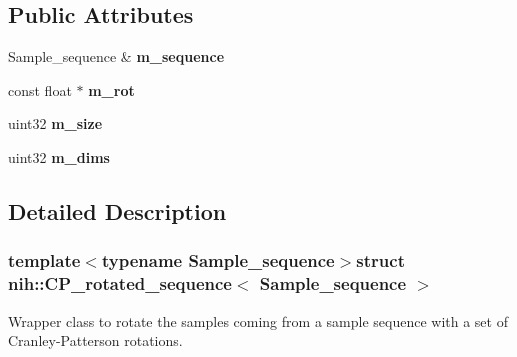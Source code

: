 \subsection*{\-Public \-Attributes}
\begin{DoxyCompactItemize}
\item 
\hypertarget{structnih_1_1_c_p__rotated__sequence_af62a09744624faa6966dd88bcce62844}{
\-Sample\-\_\-sequence \& {\bfseries m\-\_\-sequence}}
\label{structnih_1_1_c_p__rotated__sequence_af62a09744624faa6966dd88bcce62844}

\item 
\hypertarget{structnih_1_1_c_p__rotated__sequence_a170f1d2705c53b1979c5c788d0945f25}{
const float $\ast$ {\bfseries m\-\_\-rot}}
\label{structnih_1_1_c_p__rotated__sequence_a170f1d2705c53b1979c5c788d0945f25}

\item 
\hypertarget{structnih_1_1_c_p__rotated__sequence_a7a24a4f9c36f7cc0c9eebb7754f5f5cd}{
uint32 {\bfseries m\-\_\-size}}
\label{structnih_1_1_c_p__rotated__sequence_a7a24a4f9c36f7cc0c9eebb7754f5f5cd}

\item 
\hypertarget{structnih_1_1_c_p__rotated__sequence_ac064d4c0bdda2b85a8628be92c241b89}{
uint32 {\bfseries m\-\_\-dims}}
\label{structnih_1_1_c_p__rotated__sequence_ac064d4c0bdda2b85a8628be92c241b89}

\end{DoxyCompactItemize}


\subsection{\-Detailed \-Description}
\subsubsection*{template$<$typename Sample\-\_\-sequence$>$struct nih\-::\-C\-P\-\_\-rotated\-\_\-sequence$<$ Sample\-\_\-sequence $>$}

\-Wrapper class to rotate the samples coming from a sample sequence with a set of \-Cranley-\/\-Patterson rotations. 

